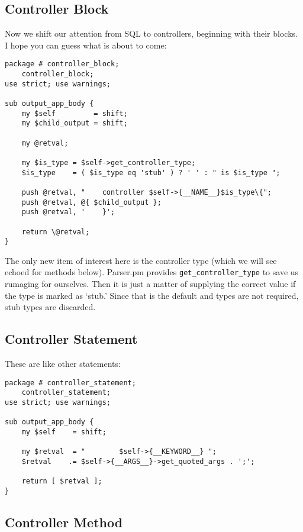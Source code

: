 \subsection*{Controller Block}

Now we shift our attention from SQL to controllers, beginning with their
blocks.  I hope you can guess what is about to come:

\begin{verbatim}
package # controller_block;
    controller_block;
use strict; use warnings;

sub output_app_body {
    my $self         = shift;
    my $child_output = shift;

    my @retval;

    my $is_type = $self->get_controller_type;
    $is_type    = ( $is_type eq 'stub' ) ? ' ' : " is $is_type ";

    push @retval, "    controller $self->{__NAME__}$is_type\{";
    push @retval, @{ $child_output };
    push @retval, '    }';

    return \@retval;
}
\end{verbatim}

The only new item of interest here is the controller type (which we will
see echoed for methods below).  Parser.pm provides \verb+get_controller_type+
to save us rumaging for ourselves.  Then it is just a matter of supplying
the correct value if the type is marked as `stub.'  Since that is the
default and types are not required, stub types are discarded.

\subsection*{Controller Statement}

These are like other statements:

\begin{verbatim}
package # controller_statement;
    controller_statement;
use strict; use warnings;

sub output_app_body {
    my $self    = shift;

    my $retval  = "        $self->{__KEYWORD__} ";
    $retval    .= $self->{__ARGS__}->get_quoted_args . ';';

    return [ $retval ];
}
\end{verbatim}

\subsection*{Controller Method}

